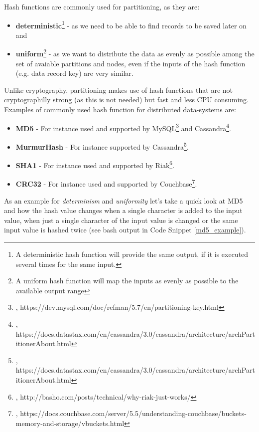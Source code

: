 {Hash functions are commonly used for partitioning, as they are:
\begin{itemize}
\item \textbf{deterministic}\footnote{A deterministic hash function will provide the same output, if it is executed several times for the same input.} - as we need to be able to find records to be saved later on and 
\item \textbf{uniform}\footnote{A uniform hash function will map the inputs as evenly as possible to the available output range} - as we want to distribute the data as evenly as possible among the set of avaiable partitions and nodes, even if the inputs of the hash function (e.g. data record key) are very similar.\\
\end{itemize} 

Unlike cryptography, partitioning makes use of hash functions that are not cryptographilly strong (as this is not needed) but fast and less CPU consuming. Examples of commonly used hash function for distributed data-systems are:
\begin{itemize}
\item \textbf{MD5} - For instance used and supported by MySQL\footnote{\cite{MYSQLHP}, https://dev.mysql.com/doc/refman/5.7/en/partitioning-key.html} and Cassandra\footnote{\cite{CASHP}, https://docs.datastax.com/en/cassandra/3.0/cassandra/architecture/archPartitionerAbout.html}.
\item \textbf{MurmurHash} - For instance supported by Cassandra\footnote{\cite{CASHP}, https://docs.datastax.com/en/cassandra/3.0/cassandra/architecture/archPartitionerAbout.html}.
\item \textbf{SHA1} - For instance used and supported by Riak\footnote{\cite{RIAKHP}, http://basho.com/posts/technical/why-riak-just-works/}.
\item \textbf{CRC32} - For instance used and supported by Couchbase\footnote{\cite{CBCRC}, https://docs.couchbase.com/server/5.5/understanding-couchbase/buckets-memory-and-storage/vbuckets.html}.\\
\end{itemize} 

As an example for \textit{determinism} and \textit{uniformity} let's take a quick look at MD5 and how the hash value changes when a single character is added to the input value, when just a single character of the input value is changed or the same input value is hashed twice (see bash output in Code Snippet \ref{md5_example}).\\

}
